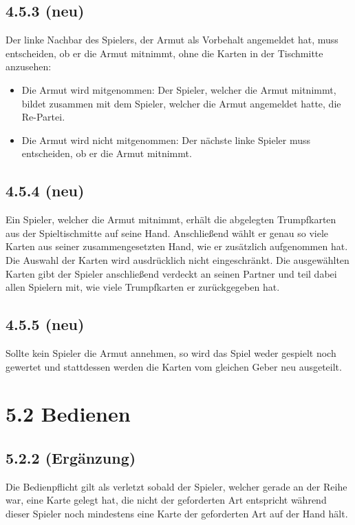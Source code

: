 \subsection*{4.5.3 (neu)}

Der linke Nachbar des Spielers, der Armut als Vorbehalt angemeldet hat,
muss entscheiden, ob er die Armut mitnimmt, ohne die Karten in der
Tischmitte anzusehen:

\begin{itemize}
    \item Die Armut wird mitgenommen: Der Spieler, welcher die Armut
        mitnimmt, bildet zusammen mit dem Spieler, welcher die Armut
        angemeldet hatte, die Re-Partei.
    \item Die Armut wird nicht mitgenommen: Der nächste linke Spieler
        muss entscheiden, ob er die Armut mitnimmt.
\end{itemize}

\subsection*{4.5.4 (neu)}

Ein Spieler, welcher die Armut mitnimmt, erhält die abgelegten
Trumpfkarten aus der Spieltischmitte auf seine Hand. Anschließend
wählt er genau so viele Karten aus seiner zusammengesetzten Hand, wie
er zusätzlich aufgenommen hat. Die Auswahl der Karten wird
ausdrücklich nicht eingeschränkt. Die ausgewählten Karten gibt der
Spieler anschließend verdeckt an seinen Partner und teil dabei allen
Spielern mit, wie viele Trumpfkarten er zurückgegeben hat.

\subsection*{4.5.5 (neu)}

Sollte kein Spieler die Armut annehmen, so wird das Spiel weder gespielt
noch gewertet und stattdessen werden die Karten vom gleichen Geber neu
ausgeteilt.

\section*{5.2 Bedienen}

\subsection*{5.2.2 (Ergänzung)}

Die Bedienpflicht gilt als verletzt sobald der Spieler, welcher gerade an der
Reihe war, eine Karte gelegt hat, die nicht der geforderten Art entspricht
während dieser Spieler noch mindestens eine Karte der geforderten Art auf der
Hand hält.


